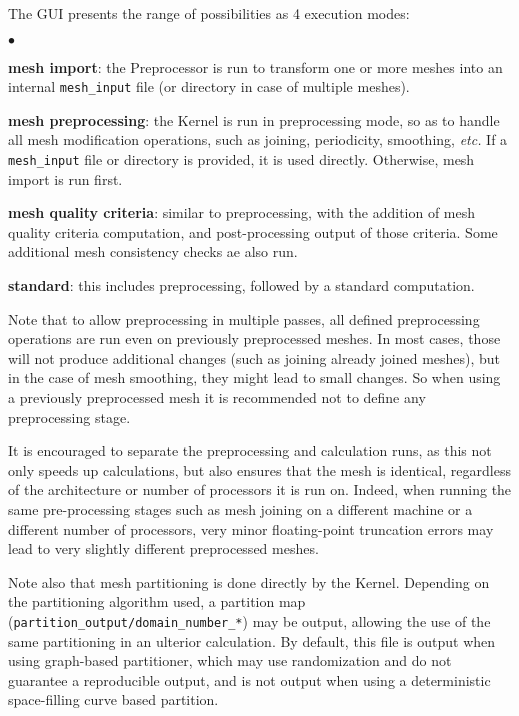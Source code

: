 {{{The GUI presents the range of possibilities as 4 execution modes:

\begin{list}{$\bullet$}{}

\item {\bf mesh import}: the Preprocessor is run to transform one or more meshes into an internal \texttt{mesh\_input} file (or directory in case of multiple meshes).

\item {\bf mesh preprocessing}: the Kernel is run in preprocessing mode, so as to handle all mesh modification operations, such as joining, periodicity, smoothing, \emph{etc.} If a \texttt{mesh\_input} file or directory is provided, it is used directly. Otherwise, mesh import is run first.

\item {\bf mesh quality criteria}: similar to preprocessing, with the addition of mesh quality criteria computation, and post-processing output of those criteria. Some additional mesh consistency checks ae also run.

\item {\bf standard}: this includes preprocessing, followed by a standard computation.

\end{list}

Note that to allow preprocessing in multiple passes, all defined preprocessing operations are run even on previously preprocessed meshes. In most cases, those will not produce additional changes (such as joining already joined meshes), but in the case of mesh smoothing, they might lead to small changes. So when using a previously preprocessed mesh it is recommended not to define any preprocessing stage.

It is encouraged to separate the preprocessing and calculation runs, as
this not only speeds up calculations, but also ensures that the mesh is identical, regardless of the architecture or number of processors it is run on. Indeed, when running the same pre-processing stages such as mesh joining on a different machine or a different number of processors, very minor floating-point truncation errors may lead to very slightly different preprocessed meshes.

Note also that mesh partitioning is done directly by the Kernel. Depending on the partitioning algorithm used, a partition map (\texttt{partition\_output/domain\_number\_*}) may be output, allowing the use of the same partitioning in an ulterior calculation. By default, this file is output when using graph-based partitioner, which may use randomization and do not guarantee a reproducible output, and is not output when using a deterministic space-filling curve based partition.

}}}

